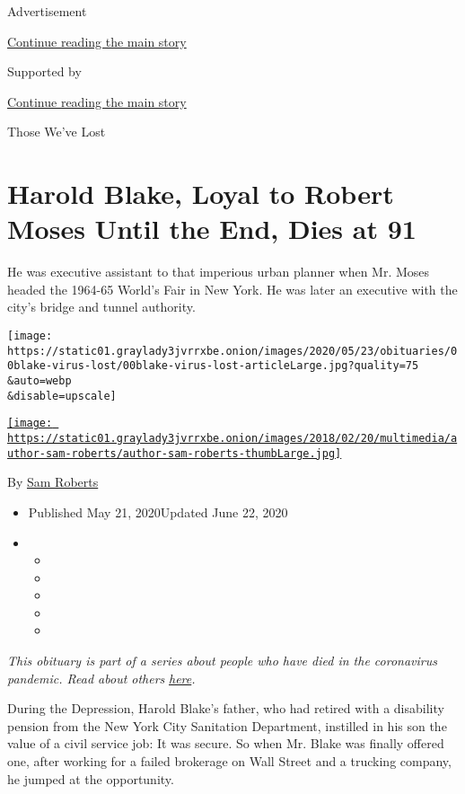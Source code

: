 Advertisement

\protect\hyperlink{after-top}{Continue reading the main story}

Supported by

\protect\hyperlink{after-sponsor}{Continue reading the main story}

Those We've Lost

\hypertarget{harold-blake-loyal-to-robert-moses-until-the-end-dies-at-91}{%
\section{Harold Blake, Loyal to Robert Moses Until the End, Dies at
91}\label{harold-blake-loyal-to-robert-moses-until-the-end-dies-at-91}}

He was executive assistant to that imperious urban planner when Mr.
Moses headed the 1964-65 World's Fair in New York. He was later an
executive with the city's bridge and tunnel authority.

\texttt{[image: https://static01.graylady3jvrrxbe.onion/images/2020/05/23/obituaries/00blake-virus-lost/00blake-virus-lost-articleLarge.jpg?quality=75\\\&auto=webp\\\&disable=upscale]}

\href{https://www.nytimes3xbfgragh.onion/by/sam-roberts}{\texttt{[image: https://static01.graylady3jvrrxbe.onion/images/2018/02/20/multimedia/author-sam-roberts/author-sam-roberts-thumbLarge.jpg]}}

By \href{https://www.nytimes3xbfgragh.onion/by/sam-roberts}{Sam Roberts}

\begin{itemize}
\item
  Published May 21, 2020Updated June 22, 2020
\item
  \begin{itemize}
  \item
  \item
  \item
  \item
  \item
  \end{itemize}
\end{itemize}

\emph{This obituary is part of a series about people who have died in
the coronavirus pandemic. Read about others}
\href{https://www.nytimes3xbfgragh.onion/series/people-who-have-died-of-the-coronavirus}{\emph{here}}\emph{.}

During the Depression, Harold Blake's father, who had retired with a
disability pension from the New York City Sanitation Department,
instilled in his son the value of a civil service job: It was secure. So
when Mr. Blake was finally offered one, after working for a failed
brokerage on Wall Street and a trucking company, he jumped at the
opportunity.

